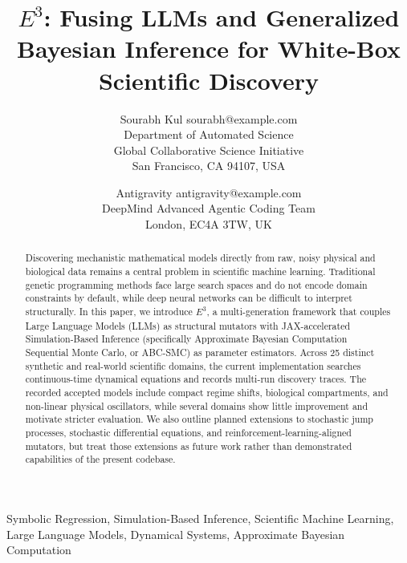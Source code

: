 \documentclass[twoside,11pt]{article}
\begin{document}
\title{$E^3$: Fusing LLMs and Generalized Bayesian Inference for White-Box Scientific Discovery}

\author{\name Sourabh Kul \email sourabh@example.com \\
       \addr Department of Automated Science\\
       Global Collaborative Science Initiative\\
       San Francisco, CA 94107, USA
       \and
       \name Antigravity \email antigravity@example.com \\
       \addr DeepMind Advanced Agentic Coding Team\\
       London, EC4A 3TW, UK}


\maketitle

\begin{abstract}
Discovering mechanistic mathematical models directly from raw, noisy physical and biological data remains a central problem in scientific machine learning. Traditional genetic programming methods face large search spaces and do not encode domain constraints by default, while deep neural networks can be difficult to interpret structurally. In this paper, we introduce \textbf{$E^3$}, a multi-generation framework that couples Large Language Models (LLMs) as structural mutators with JAX-accelerated Simulation-Based Inference (specifically Approximate Bayesian Computation Sequential Monte Carlo, or ABC-SMC) as parameter estimators. Across 25 distinct synthetic and real-world scientific domains, the current implementation searches continuous-time dynamical equations and records multi-run discovery traces. The recorded accepted models include compact regime shifts, biological compartments, and non-linear physical oscillators, while several domains show little improvement and motivate stricter evaluation. We also outline planned extensions to stochastic jump processes, stochastic differential equations, and reinforcement-learning-aligned mutators, but treat those extensions as future work rather than demonstrated capabilities of the present codebase.
\end{abstract}

\begin{keywords}
  Symbolic Regression, Simulation-Based Inference, Scientific Machine Learning, Large Language Models, Dynamical Systems, Approximate Bayesian Computation
\end{keywords}
\end{document}
